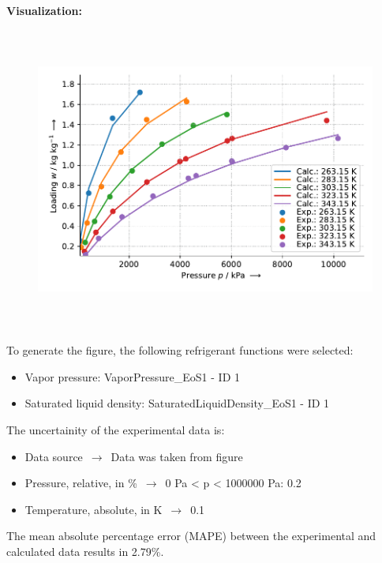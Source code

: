 \textbf{Visualization:}
%
\begin{figure}[!htp]
{\noindent\includegraphics[height=10cm, keepaspectratio]{figs/ads/ads_CarbonDioxide_activated_carbon_powder_Maxsorb_III_Toth_1.pdf}}
\end{figure}
%

To generate the figure, the following refrigerant functions were selected:
\begin{itemize}
\item Vapor pressure: VaporPressure\_EoS1 - ID 1
\item Saturated liquid density: SaturatedLiquidDensity\_EoS1 - ID 1
\end{itemize}

The uncertainity of the experimental data is:
\begin{itemize}
\item Data source $\,\to\,$ Data was taken from figure
\item Pressure, relative, in \% $\,\to\,$ 0 Pa < p < 1000000 Pa: 0.2 %
\item Temperature, absolute, in $\si{\kelvin}$ $\,\to\,$ 0.1
\end{itemize}

The mean absolute percentage error (MAPE) between the experimental and calculated data results in 2.79\%.
\FloatBarrier
\newpage
